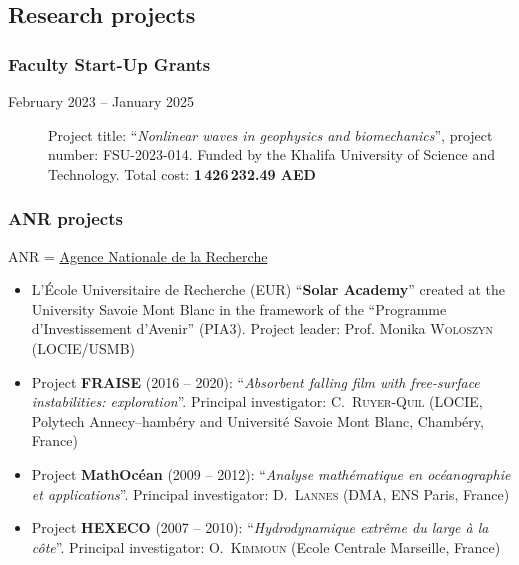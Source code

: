 \documentclass[final, a4paper, oneside, 12pt]{article}
\numberwithin{equation}{section}
\begin{document}
\subsection{Research projects}

\subsubsection{Faculty Start-Up Grants}

\begin{description}

  \item[February 2023 -- January 2025] Project title: ``\textit{Nonlinear waves in geophysics and biomechanics}'', project number: FSU-2023-014. Funded by the Khalifa University of Science and Technology. Total cost: \textbf{1\,426\,232.49 AED}

\end{description}

\subsubsection{ANR projects}

ANR = \href{http://www.agence-nationale-recherche.fr/}{Agence Nationale de la Recherche}

\begin{itemize}

  \item L'\'Ecole Universitaire de Recherche (EUR) ``\textbf{Solar Academy}'' created at the University Savoie Mont Blanc in the framework of the ``Programme d'Investissement d'Avenir'' (PIA3). Project leader: Prof. Monika \textsc{Woloszyn} (LOCIE/USMB)

  \item Project \textbf{FRAISE} (2016 -- 2020): ``\textit{Absorbent falling film with free-surface instabilities: exploration}''. Principal investigator: C.~\textsc{Ruyer}-\textsc{Quil} (LOCIE, Polytech Annecy--hamb\'ery and Universit\'e Savoie Mont Blanc, Chamb\'ery, France)

  \item Project \textbf{MathOc\'ean} (2009 -- 2012): ``\textit{Analyse math\'ematique en oc\'eanographie et applications}''. Principal investigator: D.~\textsc{Lannes} (DMA, ENS Paris, France)
  
  \item Project \textbf{HEXECO} (2007 -- 2010): ``\textit{Hydrodynamique extr\^eme du large \`a la c\^ote}''. Principal investigator: O.~\textsc{Kimmoun} (Ecole Centrale Marseille, France)
  
\end{itemize}
\end{document}
